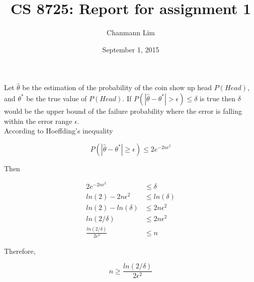 \documentclass[a4paper]{article}
\begin{document}
\title{CS 8725: Report for assignment 1}
\author{Chanmann Lim}
\date{September 1, 2015}
\maketitle

Let $\hat{\theta}$ be the estimation of the probability of the coin show up head $P(Head)$, and $\theta^*$ be the true value of $P(Head)$. If $P(|\hat{\theta} - \theta^*| > \epsilon) \le \delta$ is true then $\delta$ would be the upper bound of the failure probability where the error is falling within the error range $\epsilon$. \\

According to Hoeffding's inequality

\begin{displaymath}
P(|\hat{\theta} - \theta^*| \ge \epsilon) \le 2e^{-2n\epsilon^2}
\end{displaymath}

Then

\begin{align*}
2e^{-2n\epsilon^2} &\le \delta \\
ln(2) - 2n\epsilon^2 &\le ln(\delta) \\
ln(2) - ln(\delta) &\le 2n\epsilon^2 \\
ln(2/\delta) &\le 2n\epsilon^2 \\
\frac{ln(2/\delta)}{2\epsilon^2} &\le n
\end{align*}

Therefore,

\begin{displaymath}
n \ge \frac{ln(2/\delta)}{2\epsilon^2}
\end{displaymath}
\end{document}
